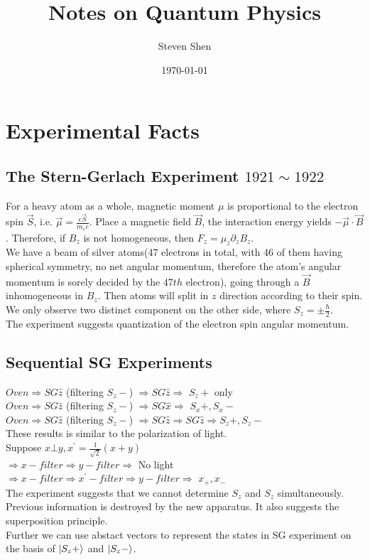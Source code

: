 \documentclass[a4paper, 11pt]{article}
\title{\textbf{Notes on Quantum Physics}}
\author{Steven Shen}
\date{\today}
\begin{document}
\maketitle

\section{Experimental Facts}
\subsection{The Stern-Gerlach Experiment $1921 \sim 1922$}
For a heavy atom as a whole, magnetic moment $\mu$ is proportional to the electron spin $\overrightarrow{S}$, i.e. 
$\overrightarrow{\mu} = \frac{e\overrightarrow{S}}{m_e c}$. Place a magnetic field $\overrightarrow{B}$, the interaction energy yields $ - \overrightarrow{\mu} \cdot \overrightarrow{B}$. Therefore, if $B_z$ is not homogeneous, then $F_z = \mu_z \partial_z B_z$.\\
\indent We have a beam of silver atoms(47 electrons in total, with 46 of them having spherical symmetry, no net angular momentum, therefore the atom's angular momentum is sorely decided by the $47th$ electron), going through a $\overrightarrow{B}$ inhomogeneous in $B_z$. Then atoms will split in $z$ direction according to their spin. We only observe two distinct component on the other side, where $S_z = \pm \frac{\hbar}{2}$.\\
\indent The experiment suggests quantization of the electron spin angular momentum.
\subsection{Sequential SG Experiments}
$Oven \Longrightarrow SG\hat{z}$ (filtering $S_z -$) $\Longrightarrow SG\hat{z} \Longrightarrow$ $S_z +$ only \\
\indent $Oven \Longrightarrow SG\hat{z}$ (filtering $S_z -$) $\Longrightarrow SG\hat{x} \Longrightarrow$ $S_x+, S_x -$ \\
\indent $Oven \Longrightarrow SG\hat{z}$ (filtering $S_z -$) $\Longrightarrow SG\hat{z} \Longrightarrow SG\hat{z} \Longrightarrow S_z +, S_z -$ \\
\indent These results is similar to the polarization of light.\\
\indent Suppose $x \bot y, x^{\prime}=\frac{1}{\sqrt{2}}(x + y)$ \\                                                  $\Longrightarrow x-filter \Longrightarrow y-filter \Longrightarrow$ No light \\
$\Longrightarrow x-filter \Longrightarrow  x^{\prime}-filter \Longrightarrow y-filter \Longrightarrow$ $x_+, x_-$ \\
\indent The experiment suggests that we cannot determine $S_z$ and $S_z$ simultaneously. Previous information is destroyed by the new apparatus. It also suggests the superposition principle.\\
\indent Further we can use abstact vectors to represent the states in SG experiment on the basis of $\ket{S_z +}$ and $\ket{S_z -}$.
\newpage
\end{document}
